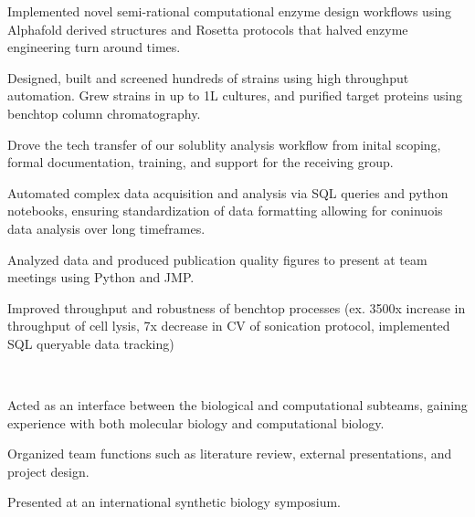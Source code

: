 \documentclass[]{forrest-resume-interfont}
\begin{document}
\begin{tightemize}
    \item Implemented novel semi-rational computational enzyme design workflows using Alphafold derived structures and Rosetta protocols that halved enzyme engineering turn around times.
    \item Designed, built and screened hundreds of strains using high throughput automation. Grew strains in up to 1L cultures, and purified target proteins using benchtop column chromatography.
    \item Drove the tech transfer of our solublity analysis workflow from inital scoping, formal documentation, training, and support for the receiving group.
    \item Automated complex data acquisition and analysis via SQL queries and python notebooks, ensuring standardization of data formatting allowing for coninuois data analysis over long timeframes.
    \item Analyzed data and produced publication quality figures to present at team meetings using Python and JMP.
    \item Improved throughput and robustness of benchtop processes (ex. 3500x increase in throughput of cell lysis, 7x decrease in CV of sonication protocol, implemented SQL queryable data tracking)
\end{tightemize}

\spacesep

\\

\begin{tightemize}
    \item Acted as an interface between the biological and computational subteams, gaining experience with both molecular biology and computational biology.
    \item Organized team functions such as literature review, external presentations, and project design.
    \item Presented at an international synthetic biology symposium.
\end{tightemize}

\spacesep

\\
\end{document}
